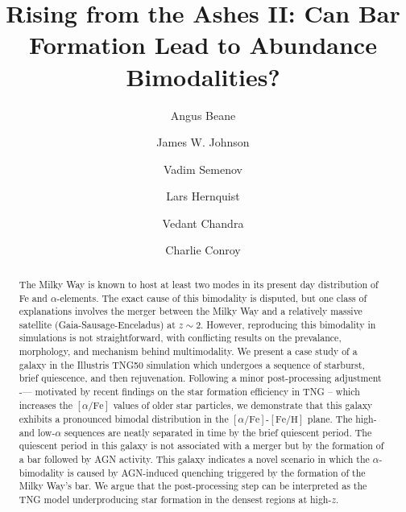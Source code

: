 \documentclass[twocolumn]{aastex631}
\newcommand{\FeH}{\ensuremath{[\textrm{Fe}/\textrm{H}]}}
\newcommand{\alphaFe}{\ensuremath{[\alpha/\textrm{Fe}]}}
\begin{document}
\title{Rising from the Ashes II: Can Bar Formation Lead to Abundance Bimodalities?}

\author{Angus Beane}

\author{James W. Johnson}

\author{Vadim Semenov}

\author{Lars Hernquist}

\author{Vedant Chandra}

\author{Charlie Conroy}

\begin{abstract}
    The Milky Way is known to host at least two modes in its present day distribution of Fe and $\alpha$-elements. The exact cause of this bimodality is disputed, but one class of explanations involves the merger between the Milky Way and a relatively massive satellite (Gaia-Sausage-Enceladus) at $z\sim2$. However, reproducing this bimodality in simulations is not straightforward, with conflicting results on the prevalance, morphology, and mechanism behind multimodality. We present a case study of a galaxy in the Illustris TNG50 simulation which undergoes a sequence of starburst, brief quiescence, and then rejuvenation. Following a minor post-processing adjustment -— motivated by recent findings on the star formation efficiency in TNG -- which increases the \alphaFe{} values of older star particles, we demonstrate that this galaxy exhibits a pronounced bimodal distribution in the \alphaFe{}-\FeH{} plane. The high- and low-$\alpha$ sequences are neatly separated in time by the brief quiescent period. The quiescent period in this galaxy is not associated with a merger but by the formation of a bar followed by AGN activity. This galaxy indicates a novel scenario in which the $\alpha$-bimodality is caused by AGN-induced quenching triggered by the formation of the Milky Way's bar. We argue that the post-processing step can be interpreted as the TNG model underproducing star formation in the densest regions at high-$z$.
  \end{abstract}
    
  
\end{document}

